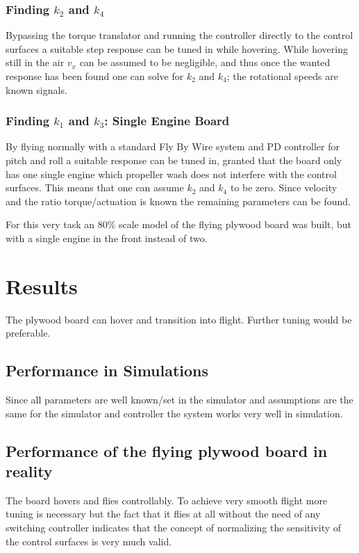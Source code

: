 \documentclass{article}
\begin{document}
\subsubsection{Finding $k_2$ and $k_4$}
Bypassing the torque translator and running the controller directly to the control surfaces a suitable step response can be tuned in while hovering.
While hovering still in the air $v_x$ can be assumed to be negligible, and thus once the wanted response has been found one can solve for $k_2$ and $k_4$; the rotational speeds are known signals.

\subsubsection{Finding $k_1$ and $k_3$: Single Engine Board}
By flying normally with a standard Fly By Wire system and PD controller for pitch and roll a suitable response can be tuned in, granted that the board only has one single engine which propeller wash does not interfere with the control surfaces.
This means that one can assume $k_2$ and $k_4$ to be zero.
Since velocity and the ratio torque/actuation is known the remaining parameters can be found.

For this very task an 80\% scale model of the flying plywood board was built, but with a single engine in the front instead of two.

\section{Results}

The plywood board can hover and transition into flight.
Further tuning would be preferable.

\subsection{Performance in Simulations}
Since all parameters are well known/set in the simulator and assumptions are the same for the simulator and controller the system works very well in simulation.

\subsection{Performance of the flying plywood board in reality}
The board hovers and flies controllably.
To achieve very smooth flight more tuning is necessary but the fact that it flies at all without the need of any switching controller indicates that the concept of normalizing the sensitivity of the control surfaces is very much valid.
\end{document}
